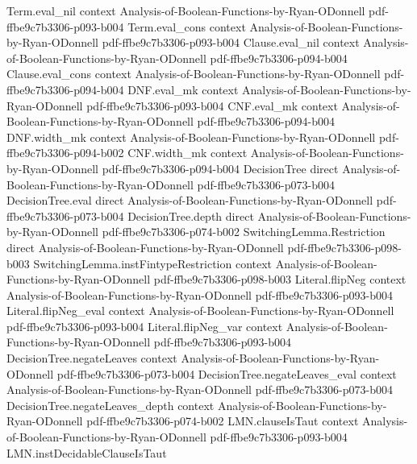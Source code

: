 \begin{theorem}
  {Term.eval_nil}
  {context}
  {Analysis-of-Boolean-Functions-by-Ryan-ODonnell}
  {pdf-ffbe9c7b3306-p093-b004}
\proofstep
  {Term.eval_cons}
  {context}
  {Analysis-of-Boolean-Functions-by-Ryan-ODonnell}
  {pdf-ffbe9c7b3306-p093-b004}
\proofstep
  {Clause.eval_nil}
  {context}
  {Analysis-of-Boolean-Functions-by-Ryan-ODonnell}
  {pdf-ffbe9c7b3306-p094-b004}
\proofstep
  {Clause.eval_cons}
  {context}
  {Analysis-of-Boolean-Functions-by-Ryan-ODonnell}
  {pdf-ffbe9c7b3306-p094-b004}
\proofstep
  {DNF.eval_mk}
  {context}
  {Analysis-of-Boolean-Functions-by-Ryan-ODonnell}
  {pdf-ffbe9c7b3306-p093-b004}
\proofstep
  {CNF.eval_mk}
  {context}
  {Analysis-of-Boolean-Functions-by-Ryan-ODonnell}
  {pdf-ffbe9c7b3306-p094-b004}
\proofstep
  {DNF.width_mk}
  {context}
  {Analysis-of-Boolean-Functions-by-Ryan-ODonnell}
  {pdf-ffbe9c7b3306-p094-b002}
\proofstep
  {CNF.width_mk}
  {context}
  {Analysis-of-Boolean-Functions-by-Ryan-ODonnell}
  {pdf-ffbe9c7b3306-p094-b004}
\proofstep
  {DecisionTree}
  {direct}
  {Analysis-of-Boolean-Functions-by-Ryan-ODonnell}
  {pdf-ffbe9c7b3306-p073-b004}
\proofstep
  {DecisionTree.eval}
  {direct}
  {Analysis-of-Boolean-Functions-by-Ryan-ODonnell}
  {pdf-ffbe9c7b3306-p073-b004}
\proofstep
  {DecisionTree.depth}
  {direct}
  {Analysis-of-Boolean-Functions-by-Ryan-ODonnell}
  {pdf-ffbe9c7b3306-p074-b002}
\proofstep
  {SwitchingLemma.Restriction}
  {direct}
  {Analysis-of-Boolean-Functions-by-Ryan-ODonnell}
  {pdf-ffbe9c7b3306-p098-b003}
\proofstep
  {SwitchingLemma.instFintypeRestriction}
  {context}
  {Analysis-of-Boolean-Functions-by-Ryan-ODonnell}
  {pdf-ffbe9c7b3306-p098-b003}
\proofstep
  {Literal.flipNeg}
  {context}
  {Analysis-of-Boolean-Functions-by-Ryan-ODonnell}
  {pdf-ffbe9c7b3306-p093-b004}
\proofstep
  {Literal.flipNeg_eval}
  {context}
  {Analysis-of-Boolean-Functions-by-Ryan-ODonnell}
  {pdf-ffbe9c7b3306-p093-b004}
\proofstep
  {Literal.flipNeg_var}
  {context}
  {Analysis-of-Boolean-Functions-by-Ryan-ODonnell}
  {pdf-ffbe9c7b3306-p093-b004}
\proofstep
  {DecisionTree.negateLeaves}
  {context}
  {Analysis-of-Boolean-Functions-by-Ryan-ODonnell}
  {pdf-ffbe9c7b3306-p073-b004}
\proofstep
  {DecisionTree.negateLeaves_eval}
  {context}
  {Analysis-of-Boolean-Functions-by-Ryan-ODonnell}
  {pdf-ffbe9c7b3306-p073-b004}
\proofstep
  {DecisionTree.negateLeaves_depth}
  {context}
  {Analysis-of-Boolean-Functions-by-Ryan-ODonnell}
  {pdf-ffbe9c7b3306-p074-b002}
\proofstep
  {LMN.clauseIsTaut}
  {context}
  {Analysis-of-Boolean-Functions-by-Ryan-ODonnell}
  {pdf-ffbe9c7b3306-p093-b004}
\proofstep
  {LMN.instDecidableClauseIsTaut}

\end{theorem}
